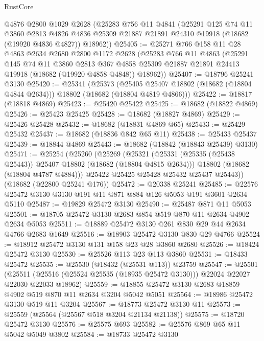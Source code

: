\begin{lexlean}{RustCore}
\begin{coremodule}
    @4876
    @2800
    @1029
    @2628
    (@25283
      @756
      @11
      @4841
      (@25291
        @125
        @74
        @11
        @3860
        @2813
        @4826
        @4836
        @25309
        @21887
        @21891
        @24310
        @19918
        (@18682 (@19920 @4836 @4827))
        @18962))
@25405 := @25271
    @766
    @158
    @11
    @28
    @4863
    @2634
    @2680
    @2800
    @1172
    @2628
    (@25283
      @766
      @11
      @4863
      (@25291
        @145
        @74
        @11
        @3860
        @2813
        @367
        @4858
        @25309
        @21887
        @21891
        @24413
        @19918
        (@18682 (@19920 @4858 @4848))
        @18962))
@25407 := @18796 @25241 @3130
@25420 := @25341
    (@25373
      (@25405 @25407 @18802 (@18682 (@18804 @4844 @2634)))
      @18802
      (@18682 (@18804 @4819 @4866)))
@25422 := @18817 (@18818 @4869)
@25423 := @25420 @25422
@25425 := @18682 (@18822 @4869)
@25426 := @25423 @25425
@25428 := @18682 (@18827 @4869)
@25429 := @25426 @25428
@25432 := @18682 (@18831 @4869 @65)
@25433 := @25429 @25432
@25437 := @18682 (@18836 @842 @65 @11)
@25438 := @25433 @25437
@25439 := @18844 @4869
@25443 := @18682 (@18842 (@18843 @25439) @3130)
@25471 := @25254
    (@25260
      (@25269
        (@25321
          (@25331 (@25335 (@25438 @25443)) @25407 @18802 (@18682 (@18804 @4815 @2634)))
          @18802
          (@18682 (@18804 @4787 @4884)))
        @25422
        @25425
        @25428
        @25432
        @25437
        @25443))
    (@18682 (@22800 @25241 @176))
@25472 := @20338 @25241
@25485 := @22576 @25472 @3130 @3130 @191 @11 @871 @884 @126 @5053 @191 @3601 @2634 @5110
@25487 := @19829 @25472 @3130
@25490 := @25487 @871 @11 @5053
@25501 := @18705 @25472 @3130 @2683 @854 @519 @870 @11 @2634 @4902 @2634 @5053
@25511 := @18889 @25472 @3130 @261 @830 @29 @44 @2634 @4766 @2683 @1649
@25516 := @18903 @25472 @3130 @830 @29 @4766
@25524 := @18912 @25472 @3130 @131 @158 @23 @28 @3860 @2680
@25526 := @18424 @25472 @3130
@25530 := @25526 @113 @23 @113 @3860
@25531 := @18433 @25472
@25535 := @25530 (@18432 (@25531 @113)) @23759
@25547 := @25501
    (@25511 (@25516 (@25524 @25535 (@18935 @25472 @3130))) @22024 @22027 @22030 @22033 @18962)
@25559 := @18855 @25472 @3130 @2683 @18859 @4902 @519 @870 @11 @2634 @3204 @5042 @5051
@25564 := @18986 @25472 @3130 @519 @11 @3204
@25567 := @18773 @25472 @3130 @11
@25573 := @25559 (@25564 (@25567 @518 @3204 @21134 @21138))
@25575 := @18720 @25472 @3130
@25576 := @25575 @693
@25582 := @25576 @869 @65 @11 @5042 @5049 @3802
@25584 := @18733 @25472 @3130

\end{coremodule}
\end{lexlean}
